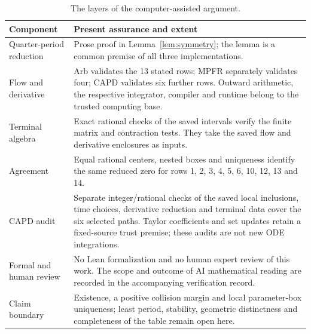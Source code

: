 \begin{table}[htbp]
\centering\small
\begin{tabular}{@{}p{.25\linewidth}p{.69\linewidth}@{}}
\toprule
Component & Present assurance and extent\\
\midrule
Quarter-period reduction & Prose proof in Lemma~\ref{lem:symmetry}; the
lemma is a common premise of all three implementations.\\
Flow and derivative & Arb validates the 13 stated rows; MPFR separately
validates four; CAPD validates six further rows. Outward arithmetic,
the respective integrator, compiler and runtime belong to the trusted
computing base.\\
Terminal algebra & Exact rational checks of the saved intervals verify
the finite matrix and contraction tests. They take the saved flow and
derivative enclosures as inputs.\\
Agreement & Equal rational centers, nested boxes and uniqueness identify
the same reduced zero for rows 1, 2, 3, 4, 5, 6, 10, 12, 13 and 14.\\
CAPD audit & Separate integer/rational checks of the saved local
inclusions, time choices, derivative reduction and terminal data cover
the six selected paths. Taylor coefficients and set updates retain a
fixed-source trust premise; these audits are not new ODE integrations.\\
Formal and human review & No Lean formalization and no human expert
review of this work. The scope and outcome of AI mathematical reading
are recorded in the accompanying verification record.\\
Claim boundary & Existence, a positive collision margin and local
parameter-box uniqueness; least period, stability, geometric
distinctness and completeness of the table remain open here.\\
\bottomrule
\end{tabular}
\caption{The layers of the computer-assisted argument.}
\label{tab:assurance}
\end{table}
